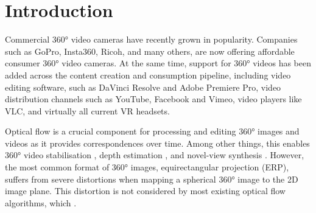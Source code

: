 \section{Introduction}
\label{sec:intro}

Commercial 360° video cameras have recently grown in popularity.
Companies such as GoPro, Insta360, Ricoh, and many others, are now offering affordable consumer 360° video cameras.
%
At the same time, support for 360° videos has been added across the content creation and consumption pipeline, including video editing software, such as DaVinci Resolve and Adobe Premiere Pro,
video distribution channels such as YouTube, Facebook and Vimeo,
video players like VLC, and virtually all current VR headsets.


Optical flow is a crucial component for processing and editing 360° images and videos as it provides correspondences over time.
Among other things, this enables 360° video stabilisation \cite{Kopf2016}, depth estimation \cite{ZioulKZAD2019}, and novel-view synthesis \cite{BerteYLR2020}.
%
However, the most common format of 360° images, equirectangular projection (ERP), suffers from severe distortions when mapping a spherical 360° image to the 2D image plane.
This distortion is not considered by most existing optical flow algorithms,
which .


